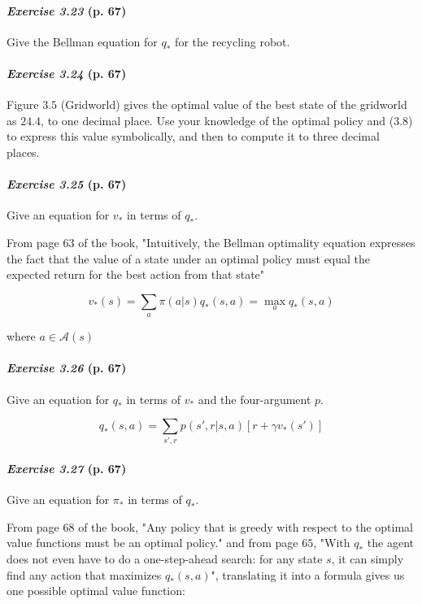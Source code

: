 \documentclass[10pt,a4paper]{article}
\begin{document}
\paragraph{\textit{Exercise 3.23} (p. 67)} Give the Bellman equation for $q_*$ for the recycling robot.

\paragraph{\textit{Exercise 3.24} (p. 67)} Figure $3.5$ (Gridworld) gives the optimal value of the best state of the gridworld as $24.4$, to one decimal place. Use your knowledge of the optimal policy and ($3.8$) to express this value symbolically, and then to compute it to three decimal places.

\clearpage
\paragraph{\textit{Exercise 3.25} (p. 67)} Give an equation for $v_*$ in terms of $q_*$.

\bigskip
From page $63$ of the book, "Intuitively, the Bellman optimality equation expresses the
fact that the value of a state under an optimal policy must equal the expected return for
the best action from that state"

\begin{equation}
v_*(s) = \sum_{a} \pi(a \lvert s) q_*(s, a) = \max_{a} q_*(s, a)
\end{equation}

where $a \in \mathcal{A}(s)$

\paragraph{\textit{Exercise 3.26} (p. 67)} Give an equation for $q_*$ in terms of $v_*$ and the four-argument $p$.

\bigskip
\begin{equation}
q_*(s, a) = \sum_{s', r} p(s', r \lvert s, a) \left[r + \gamma v_*(s')\right]
\end{equation}

\paragraph{\textit{Exercise 3.27} (p. 67)} Give an equation for $\pi_*$ in terms of $q_*$.

\bigskip

From page $68$ of the book, "Any policy that is greedy with respect to the optimal value functions must be an optimal
policy." and from page $65$, "With $q_*$ the agent does not
even have to do a one-step-ahead search: for any state $s$, it can simply find any action
that maximizes $q_*(s, a)$", translating it into a formula gives us one possible optimal value function:
\end{document}
